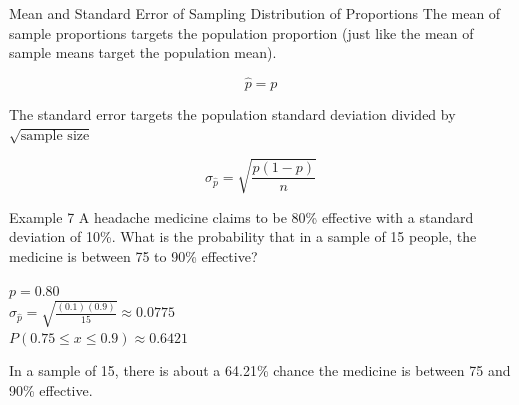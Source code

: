 \documentclass[t]{beamer}
\begin{document}
\begin{frame}{Mean and Standard Error of Sampling Distribution of Proportions}
The mean of sample proportions targets the population proportion (just like the mean of sample means target the population mean).	\pause

\[\hat{p} = p\]	\pause

The standard error targets the population standard deviation divided by $\sqrt{\text{sample size}}$	\pause

\[\sigma_{\hat{p}} = \sqrt{\frac{p(1-p)}{n}}\]
\end{frame}


\begin{frame}{Example 7}
A headache medicine claims to be 80\% effective with a standard deviation of 10\%. What is the probability that in a sample of 15 people, the medicine is between 75 to 90\% effective?	\newline\\	\pause

$p = 0.80$	\newline\\	\pause
$\sigma_{\hat{p}} = \sqrt{\frac{(0.1)(0.9)}{15}} \approx 0.0775$	\newline\\	\pause
$P(0.75 \leq x \leq 0.9) \approx 0.6421$	\newline\\	\pause

In a sample of 15, there is about a 64.21\% chance the medicine is between 75 and 90\% effective.
\end{frame}
\end{document}
